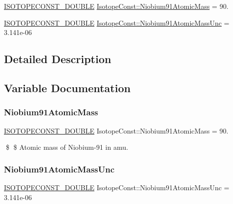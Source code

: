 \begin{DoxyCompactItemize}
\item 
\mbox{\hyperlink{group___isotope_const-_macros_ga8f45a7272ce02c0b4c65c44636ed719a}{I\+S\+O\+T\+O\+P\+E\+C\+O\+N\+S\+T\+\_\+\+D\+O\+U\+B\+LE}} \mbox{\hyperlink{group___isotope_const-_niobium-_nb91_ga7ee5038e58b164c6ede80ddda5bd342b}{Isotope\+Const\+::\+Niobium91\+Atomic\+Mass}} = 90.
\item 
\mbox{\hyperlink{group___isotope_const-_macros_ga8f45a7272ce02c0b4c65c44636ed719a}{I\+S\+O\+T\+O\+P\+E\+C\+O\+N\+S\+T\+\_\+\+D\+O\+U\+B\+LE}} \mbox{\hyperlink{group___isotope_const-_niobium-_nb91_ga827cb2e508a646b5c793014995471903}{Isotope\+Const\+::\+Niobium91\+Atomic\+Mass\+Unc}} = 3.\+141e-\/06
\end{DoxyCompactItemize}


\subsection{Detailed Description}


\subsection{Variable Documentation}
\mbox{\label{group___isotope_const-_niobium-_nb91_ga7ee5038e58b164c6ede80ddda5bd342b}} 
\subsubsection{\texorpdfstring{Niobium91\+Atomic\+Mass}{Niobium91AtomicMass}}
{\footnotesize\ttfamily \mbox{\hyperlink{group___isotope_const-_macros_ga8f45a7272ce02c0b4c65c44636ed719a}{I\+S\+O\+T\+O\+P\+E\+C\+O\+N\+S\+T\+\_\+\+D\+O\+U\+B\+LE}} Isotope\+Const\+::\+Niobium91\+Atomic\+Mass = 90.}

\$ \$ Atomic mass of Niobium-\/91 in amu. \mbox{\label{group___isotope_const-_niobium-_nb91_ga827cb2e508a646b5c793014995471903}} 
\subsubsection{\texorpdfstring{Niobium91\+Atomic\+Mass\+Unc}{Niobium91AtomicMassUnc}}
{\footnotesize\ttfamily \mbox{\hyperlink{group___isotope_const-_macros_ga8f45a7272ce02c0b4c65c44636ed719a}{I\+S\+O\+T\+O\+P\+E\+C\+O\+N\+S\+T\+\_\+\+D\+O\+U\+B\+LE}} Isotope\+Const\+::\+Niobium91\+Atomic\+Mass\+Unc = 3.\+141e-\/06}


